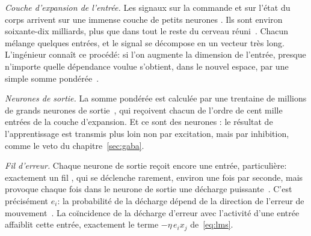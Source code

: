 \emph{Couche d'expansion de l'entrée.} Les signaux sur la commande et sur l'état du corps arrivent sur une immense couche de petits neurones . Ils sont environ soixante-dix milliards, plus que dans tout le reste du cerveau réuni~\cite{Azevedo2009}. Chacun mélange quelques entrées, et le signal se décompose en un vecteur très long. L'ingénieur connaît ce procédé: si l'on augmente la dimension de l'entrée, presque n'importe quelle dépendance voulue s'obtient, dans le nouvel espace, par une simple somme pondérée~\cite{Cover1965}.

\emph{Neurones de sortie.} La somme pondérée est calculée par une trentaine de millions de grands neurones de sortie~\cite{Andersen1992cereb}, qui reçoivent chacun de l'ordre de cent mille entrées de la couche d'expansion. Et ce sont des neurones : le résultat de l'apprentissage est transmis plus loin non par excitation, mais par inhibition, comme le veto du chapitre~\ref{sec:gaba}.

\emph{Fil d'erreur.} Chaque neurone de sortie reçoit encore une entrée, particulière: exactement un fil , qui se déclenche rarement, environ une fois par seconde, mais provoque chaque fois dans le neurone de sortie une décharge puissante~\cite{Ito2001}. C'est précisément $e_i$: la probabilité de la décharge dépend de la direction de l'erreur de mouvement~\cite{Herzfeld2018}. La coïncidence de la décharge d'erreur avec l'activité d'une entrée affaiblit cette entrée, exactement le terme $-\eta\,e_i x_j$ de~\eqref{eq:lms}.

